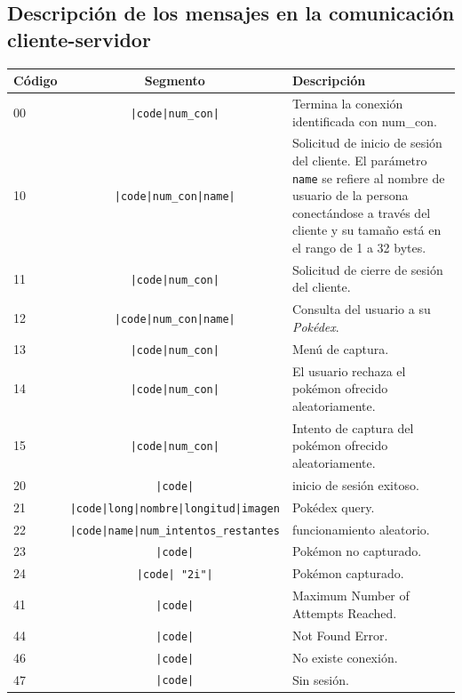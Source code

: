 \documentclass[12pt]{article}
\begin{document}
\subsection{Descripción de los mensajes en la comunicación cliente-servidor}
\begin{center}
  \begin{tabular}{|l|c|p{5.9cm}|}
    \hline
    Código & Segmento & Descripción \\ \hline
    \hline
    00 & \texttt{|code|num\_con|} & Termina la conexión identificada con num\_con. \\ \hline
    10 & \texttt{|code|num\_con|name|} & Solicitud de inicio de sesión del cliente. El parámetro \texttt{name} se refiere al nombre de usuario de la persona conectándose a través del cliente y su tamaño está en el rango de 1 a 32 bytes. \\ \hline
    11 & \texttt{|code|num\_con|} & Solicitud de cierre de sesión del cliente. \\ \hline
    12 & \texttt{|code|num\_con|name|} & Consulta del usuario a su \textit{Pokédex}. \\ \hline
    13 & \texttt{|code|num\_con|} & Menú de captura. \\ \hline
    14 & \texttt{|code|num\_con|} & El usuario rechaza el pokémon ofrecido aleatoriamente. \\ \hline
    15 & \texttt{|code|num\_con|} & Intento de captura del pokémon ofrecido aleatoriamente. \\ \hline
    20 & \texttt{|code|} & inicio de sesión exitoso. \\ \hline
    21 & \texttt{|code|long|nombre|longitud|imagen} & Pokédex query. \\ \hline %
    22 & \texttt{|code|name|num\_intentos\_restantes} & funcionamiento aleatorio. \\ \hline
    23 & \texttt{|code|} & Pokémon no capturado. \\ \hline
    24 & \texttt{|code| "2i"|} & Pokémon capturado. \\ \hline
    41 & \texttt{|code|} & Maximum Number of Attempts Reached. \\ \hline
    44 & \texttt{|code|} & Not Found Error. \\ \hline
    46 & \texttt{|code|} & No existe conexión. \\ \hline
    47 & \texttt{|code|} & Sin sesión. \\
    \hline
  \end{tabular}
\end{center}
\end{document}
